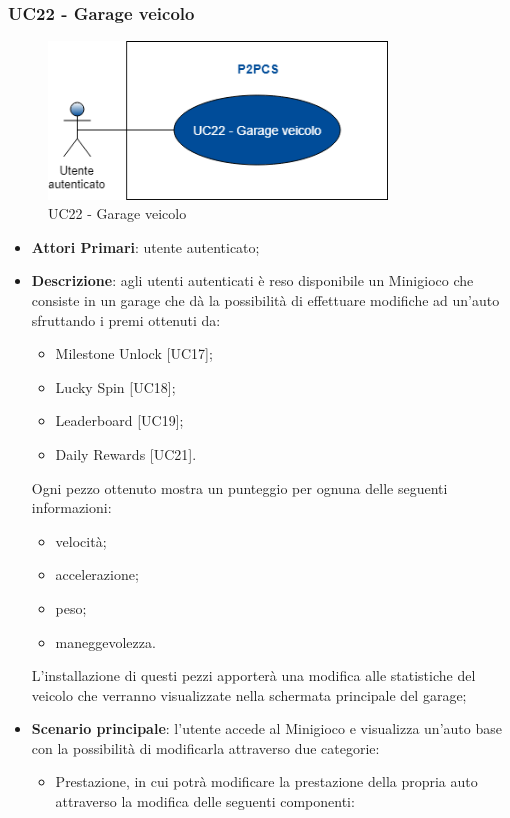 \subsubsection{UC22 - Garage veicolo}
\begin{figure}[h]
	\includegraphics[width=9cm]{res/images/UC26-Garage.png}
	\centering
	\caption{UC22 - Garage veicolo}
\end{figure}
\begin{itemize}
	\item \textbf{Attori Primari}: utente autenticato;
	\item \textbf{Descrizione}: agli utenti autenticati è reso disponibile un Minigioco che consiste in un garage che dà la possibilità di effettuare modifiche ad un'auto sfruttando i premi ottenuti da:
	\begin{itemize}
		\item Milestone Unlock [UC17];
		\item Lucky Spin [UC18];
		\item Leaderboard [UC19];
		\item Daily Rewards [UC21]. 
	\end{itemize} 
	Ogni pezzo ottenuto mostra un punteggio per ognuna delle seguenti informazioni:
	\begin{itemize}
		\item velocità;
		\item accelerazione;
		\item peso;
		\item maneggevolezza.
	\end{itemize}
	L'installazione di questi pezzi apporterà una modifica alle statistiche del veicolo che verranno visualizzate nella schermata principale del garage;
	\item \textbf{Scenario principale}: l'utente accede al Minigioco e visualizza un'auto base con la possibilità di modificarla attraverso due categorie:
	\begin{itemize}
		\item Prestazione, in cui potrà modificare la prestazione della propria auto attraverso la modifica delle seguenti componenti:

\end{itemize}
\end{itemize}
